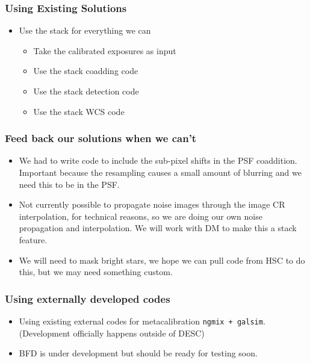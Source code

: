 \documentclass{beamer}
\begin{document}
\frame
{

    \frametitle{Using Existing Solutions}

    \begin{itemize}

                \item Use the stack for everything we can
                    \begin{itemize}
                        \item Take the calibrated exposures as input
                        \item Use the stack coadding code
                        \item Use the stack detection code
                        \item Use the stack WCS code
                    \end{itemize}

    \end{itemize}

}
\frame
{

    \frametitle{Feed back our solutions when we can't}


    \begin{itemize}


                \item We had to write code to include the sub-pixel shifts in
                    the PSF coaddition.  Important because the resampling
                    causes a small amount of blurring and we need this to be in
                    the PSF.

                \item Not currently possible to propagate noise images through the image
                  CR interpolation, for technical reasons, so we are doing our own noise
                  propagation and interpolation.  We will work with DM to make
                  this a stack feature.

                \item We will need to mask bright stars, we hope we can pull code
                    from HSC to do this, but we may need something custom.



    \end{itemize}

}



\frame
{

    \frametitle{Using externally developed codes}

    \begin{itemize}

        \item Using existing external codes for metacalibration \texttt{ngmix + galsim}.  (Development
            officially happens outside of DESC)

        \item BFD is under development but should be ready for testing soon.

    \end{itemize}

}
\end{document}
